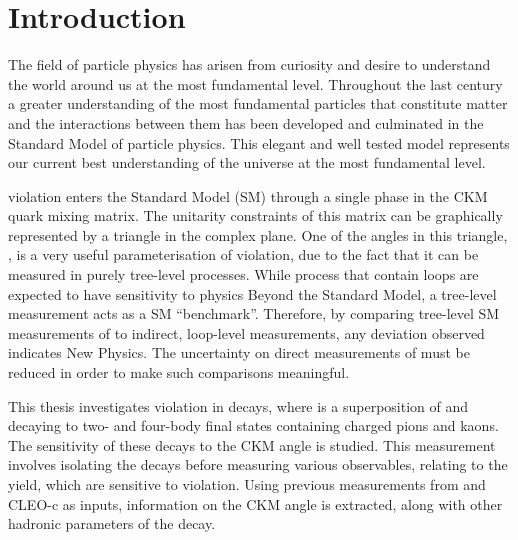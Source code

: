 %

\chapter{\label{ch:1-intro}Introduction} 

The field of particle physics has arisen from curiosity and desire to understand the world around us at the most fundamental level. Throughout the last century a greater understanding of the most fundamental particles that constitute matter and the interactions between them has been developed and culminated in the Standard Model of particle physics. This elegant and well tested model represents our current best understanding of the universe at the most fundamental level.

\CP violation enters the Standard Model (SM) through a single phase in the CKM quark mixing matrix. The unitarity constraints of this matrix can be graphically represented by a triangle in the complex plane. One of the angles in this triangle, \Pgamma, is a very useful parameterisation of \CP violation, due to the fact that it can be measured in purely tree-level processes. While process that contain loops are expected to have sensitivity to physics Beyond the Standard Model, a tree-level measurement acts as a SM ``benchmark''. Therefore, by comparing tree-level SM measurements of \Pgamma to indirect, loop-level measurements, any deviation observed indicates New Physics. The uncertainty on direct measurements of \Pgamma must be reduced in order to make such comparisons meaningful.

This thesis investigates \CP violation in \btodkst decays, where \D is a superposition of \Dz and \Dzb decaying to two- and four-body final states containing charged pions and kaons. The sensitivity of these decays to the CKM angle \Pgamma is studied. This measurement involves isolating the \btodkst decays before measuring various observables, relating to the yield, which are sensitive to \CP violation. Using previous measurements from \lhcb and CLEO-c as inputs, information on the CKM angle \Pgamma is extracted, along with other hadronic parameters of the decay.


